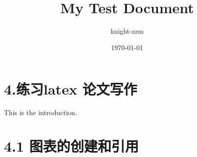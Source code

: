 \documentclass[a4paper,12pt]{article}
\begin{document}
\title{My Test Document}
\author{knight-zzm}
\date{\today}
\maketitle

\section{4.练习latex 论文写作}
This is the introduction.

\section{4.1 图表的创建和引用}
\end{document}
